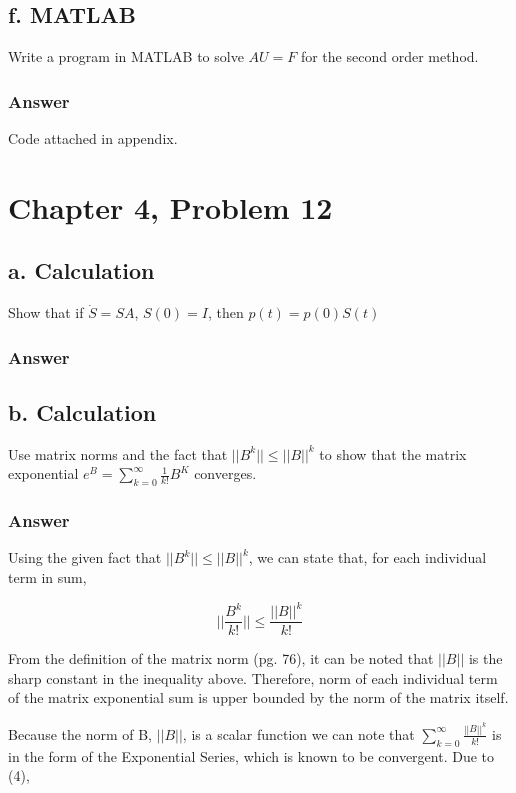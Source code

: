 \documentclass{article}
\newcommand{\n}{\newline}
\begin{document}
	\subsection{f. MATLAB}
		Write a program in MATLAB to solve $AU=F$ for the second order method.
		\subsubsection{Answer}
		Code attached in appendix.
		
	\section{Chapter 4, Problem 12}
		\subsection{a. Calculation}
		Show that if $\dot{S}=SA$, $S(0)=I$, then $p(t)=p(0)S(t)$
		\subsubsection{Answer}
		
		\subsection{b. Calculation}
		Use matrix norms and the fact that $||B^{k}||\leq||B||^{k}$ to show that the matrix exponential $e^{B}=\sum_{k=0}^{\infty}\frac{1}{k!}B^{K}$ converges.
		\subsubsection{Answer}
		
		Using the given fact that $||B^{k}||\leq||B||^{k}$, we can state that, for each individual term in sum, 
		
		\begin{equation}
			||\frac{B^{k}}{k!}||\leq\frac{||B||^{k}}{k!}
		\end{equation}
		
		From the definition of the matrix norm \cite{BG}(pg. 76), it can be noted that $||B||$ is the sharp constant in the inequality above.  Therefore, norm of each individual term of the matrix exponential sum is upper bounded by the norm of the matrix itself. \n
		
		Because the norm of B, $||B||$, is a scalar function we can note that $\sum_{k=0}^{\infty}\frac{||B||^k}{k!}$ is in the form of the Exponential Series, which is known to be convergent.  Due to (4),
		
\end{document}
